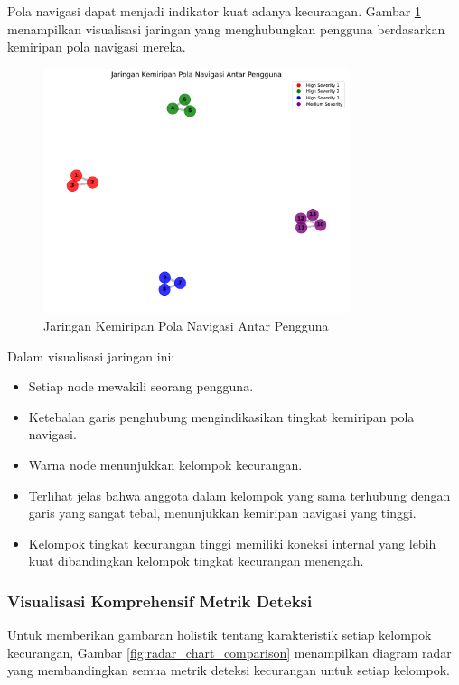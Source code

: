 Pola navigasi dapat menjadi indikator kuat adanya kecurangan. Gambar \ref{fig:navigation_network} menampilkan visualisasi jaringan yang menghubungkan pengguna berdasarkan kemiripan pola navigasi mereka.

\begin{figure}[htbp]
    \centering
    \includegraphics[width=0.8\textwidth]{figures/navigation_network.pdf}
    \caption{Jaringan Kemiripan Pola Navigasi Antar Pengguna}
    \label{fig:navigation_network}
\end{figure}

Dalam visualisasi jaringan ini:
\begin{itemize}
    \item Setiap node mewakili seorang pengguna.
    \item Ketebalan garis penghubung mengindikasikan tingkat kemiripan pola navigasi.
    \item Warna node menunjukkan kelompok kecurangan.
    \item Terlihat jelas bahwa anggota dalam kelompok yang sama terhubung dengan garis yang sangat tebal, menunjukkan kemiripan navigasi yang tinggi.
    \item Kelompok tingkat kecurangan tinggi memiliki koneksi internal yang lebih kuat dibandingkan kelompok tingkat kecurangan menengah.
\end{itemize}

\subsubsection{Visualisasi Komprehensif Metrik Deteksi}

Untuk memberikan gambaran holistik tentang karakteristik setiap kelompok kecurangan, Gambar \ref{fig:radar_chart_comparison} menampilkan diagram radar yang membandingkan semua metrik deteksi kecurangan untuk setiap kelompok.

